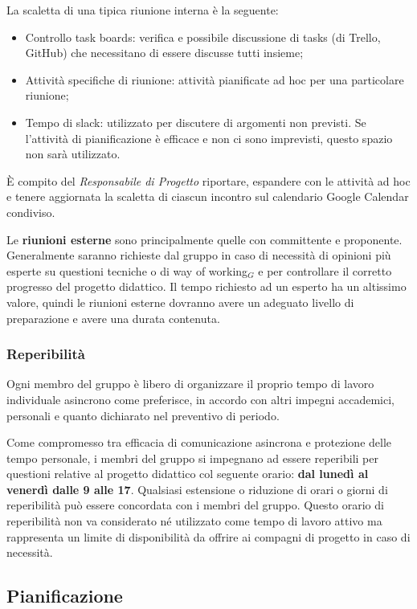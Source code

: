 La scaletta di una tipica riunione interna è la seguente:
\begin{itemize}
  \item Controllo task boards: verifica e possibile discussione di tasks (di Trello, GitHub) che necessitano di essere discusse tutti insieme;
  \item Attività specifiche di riunione: attività pianificate ad hoc per una particolare riunione;
  \item Tempo di slack: utilizzato per discutere di argomenti non previsti. Se l'attività di pianificazione è efficace e non ci sono imprevisti, questo spazio non sarà utilizzato.
\end{itemize}
È compito del \textit{Responsabile di Progetto} riportare, espandere con le attività ad hoc e tenere aggiornata la scaletta di ciascun incontro sul calendario Google Calendar condiviso.

Le \textbf{riunioni esterne} sono principalmente quelle con committente e proponente. Generalmente saranno richieste dal gruppo in caso di necessità di opinioni più esperte su questioni tecniche o di way of working$_G$ e per controllare il corretto progresso del progetto didattico. Il tempo richiesto ad un esperto ha un altissimo valore, quindi le riunioni esterne dovranno avere un adeguato livello di preparazione e avere una durata contenuta.

\subsubsection{Reperibilità}
Ogni membro del gruppo è libero di organizzare il proprio tempo di lavoro individuale asincrono come preferisce, in accordo con altri impegni accademici, personali e quanto dichiarato nel preventivo di periodo.

Come compromesso tra efficacia di comunicazione asincrona e protezione delle tempo personale, i membri del gruppo si impegnano ad essere reperibili per questioni relative al progetto didattico col seguente orario: \textbf{dal lunedì al venerdì dalle 9 alle 17}. Qualsiasi estensione o riduzione di orari o giorni di reperibilità può essere concordata con i membri del gruppo. Questo orario di reperibilità non va considerato né utilizzato come tempo di lavoro attivo ma rappresenta un limite di disponibilità da offrire ai compagni di progetto in caso di necessità.

\subsection{Pianificazione}

